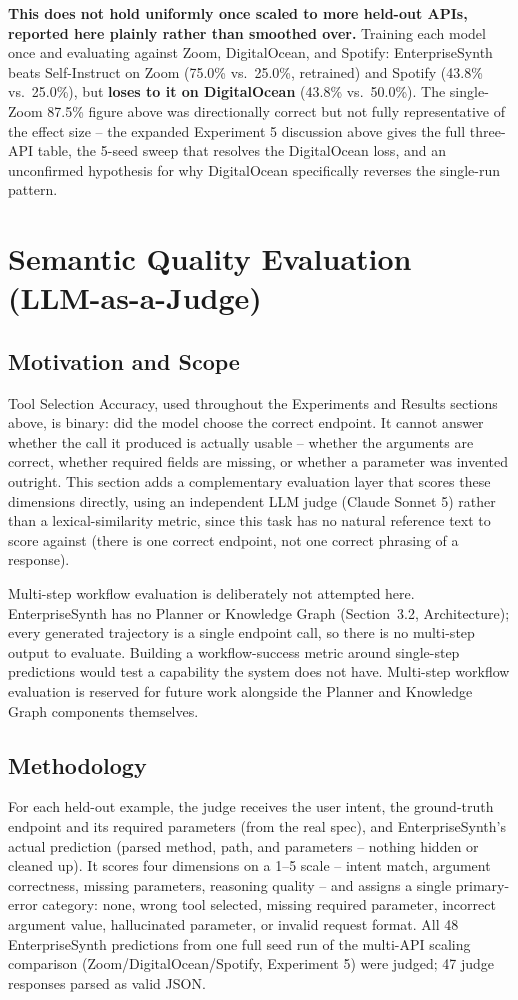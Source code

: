 \documentclass[11pt]{article}
\begin{document}
\textbf{This does not hold uniformly once scaled to more held-out APIs, reported here plainly
rather than smoothed over.} Training each model once and evaluating against Zoom, DigitalOcean,
and Spotify: EnterpriseSynth beats Self-Instruct on Zoom (75.0\% vs.\ 25.0\%, retrained) and
Spotify (43.8\% vs.\ 25.0\%), but \textbf{loses to it on DigitalOcean} (43.8\% vs.\ 50.0\%). The
single-Zoom 87.5\% figure above was directionally correct but not fully representative of the
effect size -- the expanded Experiment 5 discussion above gives the full three-API table, the
5-seed sweep that resolves the DigitalOcean loss, and an unconfirmed hypothesis for why
DigitalOcean specifically reverses the single-run pattern.

\section{Semantic Quality Evaluation (LLM-as-a-Judge)}

\subsection{Motivation and Scope}
Tool Selection Accuracy, used throughout the Experiments and Results sections above, is binary:
did the model choose the correct endpoint. It cannot answer whether the call it
produced is actually usable -- whether the arguments are correct, whether required fields are
missing, or whether a parameter was invented outright. This section adds a complementary
evaluation layer that scores these dimensions directly, using an independent LLM judge (Claude
Sonnet 5) rather than a lexical-similarity metric, since this task has no natural reference text
to score against (there is one correct endpoint, not one correct phrasing of a response).

Multi-step workflow evaluation is deliberately not attempted here. EnterpriseSynth has no Planner
or Knowledge Graph (Section~3.2, Architecture); every generated trajectory is a single
endpoint call, so there is no multi-step output to evaluate. Building a workflow-success metric
around single-step predictions would test a capability the system does not have. Multi-step
workflow evaluation is reserved for future work alongside the Planner and Knowledge Graph
components themselves.

\subsection{Methodology}
For each held-out example, the judge receives the user intent, the ground-truth endpoint and its
required parameters (from the real spec), and EnterpriseSynth's actual prediction (parsed method,
path, and parameters -- nothing hidden or cleaned up). It scores four dimensions on a 1--5 scale
-- intent match, argument correctness, missing parameters, reasoning quality -- and assigns a
single primary-error category: none, wrong tool selected, missing required parameter, incorrect
argument value, hallucinated parameter, or invalid request format. All 48 EnterpriseSynth
predictions from one full seed run of the multi-API scaling comparison
(Zoom/DigitalOcean/Spotify, Experiment 5) were judged; 47 judge responses parsed as valid JSON.
\end{document}
